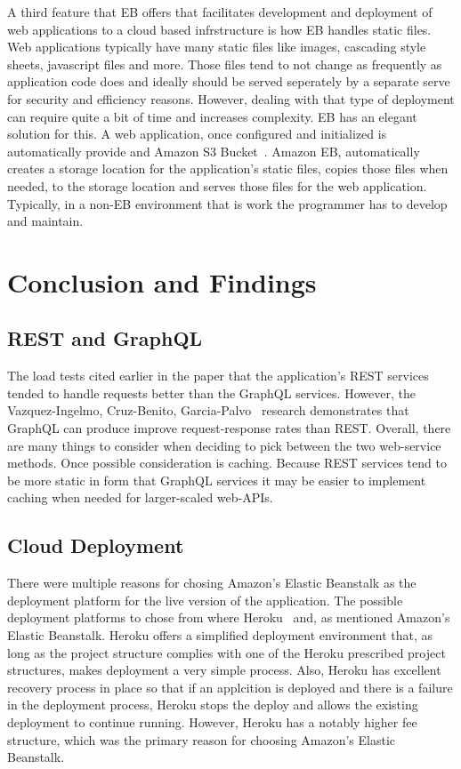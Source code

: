 A third feature that EB offers that facilitates development and deployment of 
web applications to a cloud based infrstructure is how EB handles static 
files.  Web applications typically have many static files like images, 
cascading style sheets, javascript files and more.  Those files tend to not 
change as frequently as application code does and ideally should be served 
seperately by a separate serve for security and efficiency reasons.  However, 
dealing with that type of deployment can require quite a bit of time and 
increases complexity.  EB has an elegant solution for this.  A web 
application, once configured and initialized is automatically provide and 
Amazon S3 Bucket~\cite{S3Bucket2018}.  Amazon EB, automatically creates a 
storage location for the application's static files, copies those files when 
needed, to the storage location and serves those files for the web 
application.  Typically, in a non-EB environment that is work the programmer 
has to develop and maintain.

\section{Conclusion and Findings}

\subsection{REST and GraphQL}
The load tests cited earlier in the paper that the application's REST services 
tended to handle requests better than the GraphQL services.  However, the 
Vazquez-Ingelmo, Cruz-Benito, Garcia-Palvo~\cite{hid505Vzquez2017} research 
demonstrates that GraphQL can produce improve request-response rates than 
REST.  Overall, there are many things to consider when deciding to pick 
between the two web-service methods.  Once possible consideration is caching.  
Because REST services tend to be more static in form that GraphQL services it 
may be easier to implement caching when needed for larger-scaled web-APIs.

\subsection{Cloud Deployment}
There were multiple reasons for chosing Amazon's Elastic Beanstalk as the 
deployment platform for the live version of the application.  The possible 
deployment platforms to chose from where Heroku~\cite{Heroku2018} and, as 
mentioned Amazon's Elastic Beanstalk.  Heroku offers a simplified deployment 
environment that, as long as the project structure complies with one of the 
Heroku prescribed project structures, makes deployment a very simple process.  
Also, Heroku has excellent recovery process in place so that if an applcition 
is deployed and there is a failure in the deployment process, Heroku stops the 
deploy and allows the existing deployment to continue running.  However, 
Heroku has a notably higher fee structure, which was the primary reason for 
choosing Amazon's Elastic Beanstalk.  

